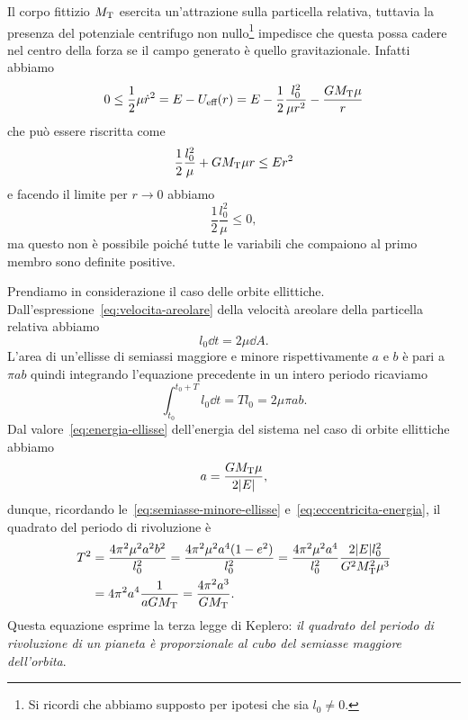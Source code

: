 {Il corpo fittizio $M_\textup{T}$ esercita un'attrazione sulla particella
relativa, tuttavia la presenza del potenziale centrifugo non
nullo\footnote{Si ricordi che abbiamo supposto per ipotesi che sia $l_0\neq 0$.}
impedisce che questa possa cadere nel centro della forza se il campo generato è
quello gravitazionale. Infatti abbiamo
\begin{equation}
  0\leq \frac{1}{2}\mu\dot{r}^2 = E - U_\textup{eff}(r) = E -
  \frac{1}{2}\frac{l_0^2}{\mu r^2} - \frac{GM_\textup{T}\mu}{r}
\end{equation}
che può essere riscritta come
\begin{equation}
  \frac{1}{2}\frac{l_0^2}{\mu} + GM_\textup{T}\mu r \leq Er^2
\end{equation}
e facendo il limite per $r \to 0$ abbiamo
\begin{equation}
  \frac{1}{2}\frac{l_0^2}{\mu} \leq 0,
\end{equation}
ma questo non è possibile poiché tutte le variabili che compaiono al primo
membro sono definite positive.

Prendiamo in considerazione il caso delle orbite
ellittiche. Dall'espressione~\eqref{eq:velocita-areolare} della velocità
areolare della particella relativa abbiamo
\begin{equation}
  l_0 \dd t = 2\mu\dd A.
\end{equation}
L'area di un'ellisse di semiassi maggiore e minore rispettivamente $a$ e $b$ è
pari a $\pi ab$ quindi integrando l'equazione precedente in un intero periodo
ricaviamo
\begin{equation}
    \int_{t_0}^{t_0+T} l_0\dd t = Tl_0 = 2\mu\pi ab.
\end{equation}
Dal valore~\eqref{eq:energia-ellisse} dell'energia del sistema nel caso di
orbite ellittiche abbiamo
\begin{equation}
  a = \frac{GM_\textup{T}\mu}{2\lvert E\rvert},
\end{equation}
dunque, ricordando le~\eqref{eq:semiasse-minore-ellisse}
e~\eqref{eq:eccentricita-energia}, il quadrato del periodo di rivoluzione è
\begin{equation}
  \label{eq:terza-legge-keplero}
  \begin{split}
    T^2 &= \frac{4\pi^2\mu^2a^2b^2}{l_0^2} = \frac{4\pi^2\mu^2a^4(1-e^2)}{l_0^2}
    = \frac{4\pi^2\mu^2a^4}{l_0^2}\frac{2\lvert E\rvert l_0^2}{G^2M_\textup{T}^2\mu^3} \\
    &= 4\pi^2a^4\frac{1}{aGM_\textup{T}} = \frac{4\pi^2a^3}{GM_\textup{T}}.
  \end{split}
\end{equation}
Questa equazione esprime la terza legge di Keplero: \emph{il quadrato del
  periodo di rivoluzione di un pianeta è proporzionale al cubo del semiasse
  maggiore dell'orbita}.

}
